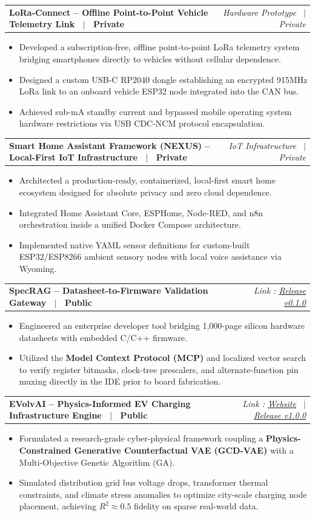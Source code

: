 \documentclass[letterpaper,10pt]{article}
\makeatletter
\newcommand{\resumeProjectHeading}[2]{
  \vspace{-2pt}\item
    \begin{tabular*}{\linewidth}[t]{l@{\extracolsep{\fill}}r}
      \textbf{#1} & \textit{\small #2} \\
    \end{tabular*}\vspace{-3pt}
}
\newcommand{\resumeItemListStart}{\begin{itemize}[leftmargin=14pt, labelsep=4pt, itemsep=0.5pt, parsep=0pt]}
\newcommand{\resumeItemListEnd}{\end{itemize}\vspace{-3pt}}
\makeatother
\begin{document}
    \resumeProjectHeading
      {LoRa-Connect -- Offline Point-to-Point Vehicle Telemetry Link \ $|$ \ Private}{Hardware Prototype \ $|$ \ Private}
      \resumeItemListStart
        \item{Developed a subscription-free, offline point-to-point LoRa telemetry system bridging smartphones directly to vehicles without cellular dependence.}
        \item{Designed a custom USB-C RP2040 dongle establishing an encrypted 915MHz LoRa link to an onboard vehicle ESP32 node integrated into the CAN bus.}
        \item{Achieved sub-mA standby current and bypassed mobile operating system hardware restrictions via USB CDC-NCM protocol encapsulation.}
      \resumeItemListEnd

    \resumeProjectHeading
      {Smart Home Assistant Framework (NEXUS) -- Local-First IoT Infrastructure \ $|$ \ Private}{IoT Infrastructure \ $|$ \ Private}
      \resumeItemListStart
        \item{Architected a production-ready, containerized, local-first smart home ecosystem designed for absolute privacy and zero cloud dependence.}
        \item{Integrated Home Assistant Core, ESPHome, Node-RED, and n8n orchestration inside a unified Docker Compose architecture.}
        \item{Implemented native YAML sensor definitions for custom-built ESP32/ESP8266 ambient sensory nodes with local voice assistance via Wyoming.}
      \resumeItemListEnd

    \resumeProjectHeading
      {SpecRAG -- Datasheet-to-Firmware Validation Gateway \ $|$ \ Public}{Link : \href{https://github.com/seeramsujay/specRAG/releases/tag/v0.1.0}{Release v0.1.0}}
      \resumeItemListStart
        \item{Engineered an enterprise developer tool bridging 1,000-page silicon hardware datasheets with embedded C/C++ firmware.}
        \item{Utilized the \textbf{Model Context Protocol (MCP)} and localized vector search to verify register bitmasks, clock-tree prescalers, and alternate-function pin muxing directly in the IDE prior to board fabrication.}
      \resumeItemListEnd

    \resumeProjectHeading
      {EVolvAI -- Physics-Informed EV Charging Infrastructure Engine \ $|$ \ Public}{Link : \href{https://EVolvAI.vercel.app}{Website} \ $|$ \ \href{https://github.com/seeramsujay/EVolvAI/releases/tag/v1.0.0}{Release v1.0.0}}
      \resumeItemListStart
        \item{Formulated a research-grade cyber-physical framework coupling a \textbf{Physics-Constrained Generative Counterfactual VAE (GCD-VAE)} with a Multi-Objective Genetic Algorithm (GA).}
        \item{Simulated distribution grid bus voltage drops, transformer thermal constraints, and climate stress anomalies to optimize city-scale charging node placement, achieving $R^2 \approx 0.5$ fidelity on sparse real-world data.}
      \resumeItemListEnd
\end{document}
